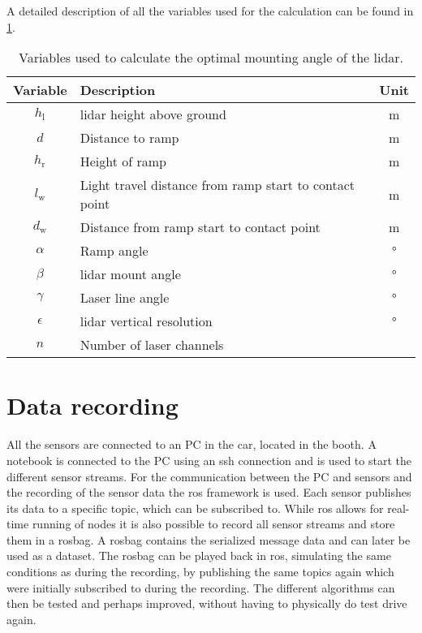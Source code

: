 A detailed description of all the variables used for the calculation can be found in \cref{tab:lidar_mount}.
\begin{table}[htbp]
	\centering
	\caption{Variables used to calculate the optimal mounting angle of the \gls{lidar}.}
	\label{tab:lidar_mount}
	\begin{tabular}[t]{clc}
		\toprule
		\textbf{Variable} & \textbf{Description}                                   & \textbf{Unit} \\
		\midrule
		$h_\mathrm{l} $   & \gls{lidar} height above ground                        & \si{\metre}   \\
		$d$               & Distance to ramp                                       & \si{\metre}   \\
		$h_\mathrm{r}$    & Height of ramp                                         & \si{\metre}   \\
		$l_\mathrm{w}$    & Light travel distance from ramp start to contact point & \si{\metre}   \\
		$d_\mathrm{w}$    & Distance from ramp start to contact point              & \si{\metre}   \\
		$\alpha$          & Ramp angle                                             & \si{\degree}  \\
		$\beta$           & \gls{lidar} mount angle                                & \si{\degree}  \\
		$\gamma$          & Laser line angle                                       & \si{\degree}  \\
		$\epsilon$        & \gls{lidar} vertical resolution                        & \si{\degree}  \\
		$n$               & Number of laser channels                               &               \\
		\bottomrule
	\end{tabular}
\end{table}


\section{Data recording}
All the sensors are connected to an PC in the car, located in the booth.
A notebook is connected to the PC using an \gls{ssh} connection and is used to start the different sensor streams.
For the communication between the PC and sensors and the recording of the sensor data the \gls{ros} framework is used.
Each sensor publishes its data to a specific topic, which can be subscribed to.
While \gls{ros} allows for real-time running of nodes it is also possible to record all sensor streams and store them in a rosbag.
A rosbag contains the serialized message data and can later be used as a dataset.
The rosbag can be played back in \gls{ros}, simulating the same conditions as during the recording, by publishing the same topics again which were initially subscribed to during the recording.
The different algorithms can then be tested and perhaps improved, without having to physically do test drive again.


